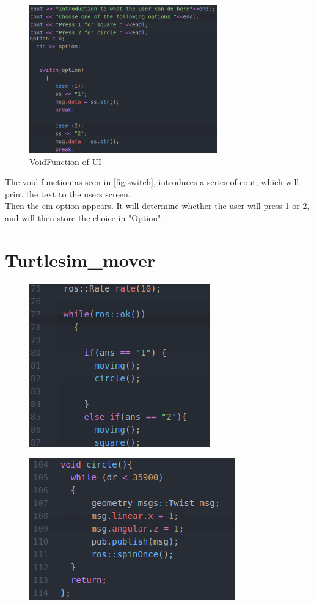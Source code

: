 \begin{figure}[h]
\begin{center}
\includegraphics[width=.5\textwidth]{figures/switch.png}
\caption{VoidFunction of UI}
\end{center}
\end{figure}\label{fig:switch}

The void function as seen in \ref{fig:switch}, introduces a series of cout, which will print the text to the users screen.\\
Then the cin option appears. It will determine whether the user will press 1 or 2, and will then store the choice in "Option".\\



\section{Turtlesim\_mover}

\begin{figure}[h]
\includegraphics[width=.5\textwidth]{figures/while.png}
\end{figure}\label{fig:while}



\begin{figure}[h]
\includegraphics[width=.5\textwidth]{figures/void-circle.png}
\end{figure}\label{fig:void-circle}
